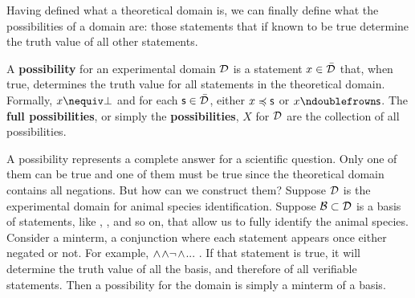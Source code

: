\documentclass[11pt,letterpaper,fleqn]{memoir} %
\begin{document}
Having defined what a theoretical domain is, we can finally define what the possibilities of a domain are: those statements that if known to be true determine the truth value of all other statements.

\begin{mathSection}

\begin{defn}
	A \textbf{possibility} for an experimental domain $\mathcal{D}$ is a statement $x \in \bar{\mathcal{D}}$ that, when true, determines the truth value for all statements in the theoretical domain. Formally, $x \nequiv \contradiction$ and for each $\mathsf{s} \in \bar{\mathcal{D}}$, either $x \preccurlyeq \mathsf{s}$ or $x \ncomp \mathsf{s}$. The \textbf{full possibilities}, or simply the \textbf{possibilities}, $X$ for $\mathcal{D}$ are the collection of all possibilities.
\end{defn}

\end{mathSection}

A possibility represents a complete answer for a scientific question. Only one of them can be true and one of them must be true since the theoretical domain contains all negations. But how can we construct them? Suppose $\mathcal{D}$ is the experimental domain for animal species identification. Suppose $\mathcal{B} \subset \mathcal{D}$ is a basis of statements, like , ,  and so on, that allow us to fully identify the animal species. Consider a minterm, a conjunction where each statement appears once either negated or not. For example, $\wedge$$\wedge\neg$$\wedge$... . If that statement is true, it will determine the truth value of all the basis, and therefore of all verifiable statements. Then a possibility for the domain is simply a minterm of a basis.
\end{document}
